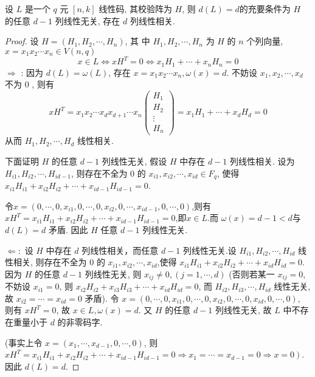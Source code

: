 \begin{theorem}
    设 $ L $ 是一个 $ q $ 元 $ [n, k] $ 线性码, 其校验阵为 $ H $, 则 $ d(L)=d $的充要条件为 $ H $ 的任意 $ d-1 $ 列线性无关, 存在 $ d $ 列线性相关.
\end{theorem}
\begin{proof}
设 $ H=\left(H_{1}, H_{2}, \cdots, H_{n}\right) $, 其 中 $ H_{1}, H_{2}, \cdots, H_{n} $ 为 $ H $ 的 $ n $ 个列向量, $ x=x_{1} x_{2} \cdots x_{n} \in V(n, q) $
$$
x \in L \Leftrightarrow x H^{T}=0 \Leftrightarrow x_{1} H_{1}+\cdots+x_{n} H_{n}=0
$$
$ \Rightarrow $ : 因为 $ d(L)=\omega(L) $, 存在 $ x=x_{1} x_{2} \cdots x_{n}, \omega(x)=d $. 不妨设 $ x_{1}, x_{2}, \cdots, x_{d} $ 不为 0 , 则有
$$
x H^{T}=x_{1} x_{2} \cdots x_{d} x_{d+1} \cdots x_{n}\left(\begin{array}{c}
H_{1} \\
H_{2} \\
\vdots \\
H_{n}
\end{array}\right)=x_{1} H_{1}+\cdots+x_{d} H_{d}=0
$$
从而 $ H_{1}, H_{2}, \cdots, H_{d} $ 线性相关.

下面证明 $ H $ 的任意 $ d-1 $ 列线性无关, 假设 $ H $ 中存在 $ d-1 $ 列线性相关. 设为 $ H_{i 1}, H_{i 2}, \cdots, H_{i d-1} $, 则存在不全为 0 的 $ x_{i 1}, x_{i 2}, \cdots, x_{i d} \in F_{q} $, 使得$x_{i 1} H_{i 1}+x_{i 2} H_{i 2}+\cdots+x_{i d-1} H_{i d-1}=0$.

令$x=\left(0, \cdots, 0, x_{i 1}, 0, \cdots, 0, x_{i 2}, 0, \cdots, x_{i d-1}, 0, \cdots, 0\right)$,则有$ x H^{T}=x_{i 1} H_{i 1}+x_{i 2} H_{i 2}+\cdots+x_{i d-1} H_{i d-1}=0 $,即$ x \in L$.而 
$\omega(x)=d-1<d$与$d(L)=d $ 矛盾. 因此 $ H $ 任意 $ d-1 $ 列线性无关.

$ \Leftarrow: $ 设 $ H $ 中存在 $ d $ 列线性相关，而任意 $ d-1 $ 列线性无关.设 $ H_{i 1}, H_{i 2}, \cdots, H_{i d} $ 线性相关, 则存在不全为 0 的 $ x_{i 1}, x_{i 2}, \cdots, x_{i d} $,使得 $ x_{i 1} H_{i 1}+x_{i 2} H_{i 2}+\cdots+x_{i d} H_{i d}=0 $. 因为 $ H $ 的任意 $ d-1 $ 列线性无关, 则 $ x_{i j} \neq 0,(j=1, \cdots, d) $ (否则若某一 $ x_{i j}=0 $, 不妨设 $ x_{i 1}=0 $, 则 $ x_{i 2} H_{i 2}+x_{i 3} H_{i 3}+\cdots+x_{i d} H_{i d}=0 $, 而 $ H_{i 2}, H_{i 3}, \cdots, H_{i d} $ 线性无关,故 $ x_{i 2}=\cdots=x_{i d}=0 $ 矛盾).
令 $x=\left(0, \cdots, 0, x_{i 1}, 0, \cdots, 0, x_{i 2}, 0, \cdots, 0, x_{i d}, 0, \cdots, 0\right)$, 则有 $ x H^{T}=0 $, 故 $ x \in L, \omega(x)=d $.
又 $ H $ 的任意 $ d-1 $ 列线性无关, 故 $ L $ 中不存在重量小于 $ d $ 的非零码字. 

(事实上令
$x=\left(x_{1}, \cdots, x_{d-1}, 0, \cdots, 0\right)$, 则 $ x H^{T}=x_{i 1} H_{i 1}+x_{i 2} H_{i 2}+\cdots+x_{i d-1} H_{i d-1}=0 \left. \Rightarrow x_{1}=\cdots=x_{d-1}=0 \Rightarrow x=0\right)$. 
因此 $ d(L)=d $.
\end{proof}


